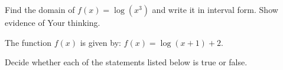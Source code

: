 \documentclass[11pt,answers]{exam}
\begin{document}
\begin{questions}


\addpoints



\question[2] Find the domain of $\displaystyle f(x)=\log \left (x^3\right)$ and write it in interval form. Show evidence of Your thinking.


\fillwithdottedlines{3cm}

\medskip

\question The function $f(x)$ is given by: $\displaystyle f(x) = \log (x+1)+2$. 


\medskip

\question Decide whether each of the statements listed below is true or false.


\end{questions}
\end{document}

